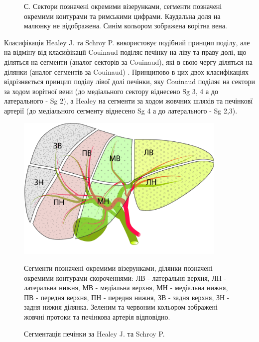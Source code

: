 \begin{refsection}
\begin{figure}[htbp]
\medskip
\small
С. Сектори позначені окремими візерунками, сегменти позначені окремими контурами та римськими цифрами. Каудальна доля на малюнку не відображена. Синім кольором зображена ворітна вена.

\end{figure}

Класифікація Healey J. та Schroy P. використовує подібний принцип поділу, але на відміну від класифікації Couinaud поділяє печінку на ліву та праву долі, що діляться на сегменти (аналог секторів за Couinaud), які в свою чергу діляться на ділянки (аналог сегментів за Couinaud) \cite{HEALEY1953}. Принципово в цих двох класифікаціях відрізняється принцип поділу лівої долі печінки, яку Couinaud поділяє на сектори за ходом ворітної вени (до медіального сектору віднесено Sg 3, 4 а до латерального -  Sg 2), а Healey на сегменти за ходом жовчних шляхів та печінковї артерії (до медіального сегменту віднесено Sg 4 а до латерального - Sg 2,3).  

\begin{figure}[htbp]
\caption{Сегментація печінки за Healey J. та Schroy P.}

\includegraphics[width=0.9\textwidth]{Illustrations/Chapter_01/Healey.jpg}
\label{fig:Healey}

\medskip
\small
Сегменти позначені окремими візерунками, ділянки позначені окремими контурами скороченнями: ЛВ - латеральня верхня, ЛН - латеральна нижня, МВ - медіальна верхня, МН - медіальна нижня, ПВ - передня верхня, ПН - передня нижня, ЗВ - задня верхня, ЗН - задня нижня ділянка. Зеленим та червоним кольором зображені жовчні протоки та печінкова артерія відповідно.
\end{figure}


\end{refsection}

